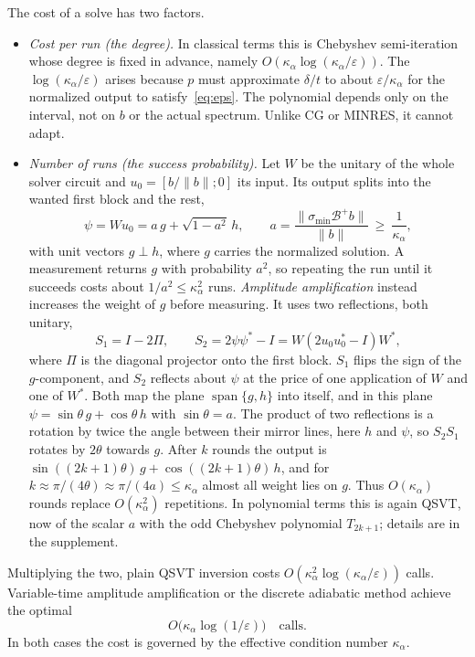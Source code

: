 \documentclass[11pt,a4paper]{article}
\newcommand{\B}{\mathcal{B}}
\theoremstyle{remark}
\begin{document}
The cost of a solve has two factors.
\begin{itemize}
\item \emph{Cost per run (the degree).} In classical terms this is Chebyshev semi-iteration whose degree is
  fixed in advance, namely $O(\kappa_\alpha\log(\kappa_\alpha/\varepsilon))$. The $\log(\kappa_\alpha/\varepsilon)$
  arises because $p$ must approximate $\delta/t$ to about $\varepsilon/\kappa_\alpha$ for the
  normalized output to satisfy~\eqref{eq:eps}. The polynomial
  depends only on the interval, not on $b$ or the actual spectrum. Unlike CG
  or MINRES, it cannot adapt.
\item \emph{Number of runs (the success probability).} Let $W$ be the unitary
  of the whole solver circuit and $u_0=[b/\|b\|;0]$ its input. Its output splits into
  the wanted first block and the rest,
  \[
  \psi=Wu_0=a\,g+\sqrt{1-a^2}\,h,\qquad
  a=\frac{\|\sigma_{\min}\B^+b\|}{\|b\|}\ \ge\ \frac1{\kappa_\alpha},
  \]
  with unit vectors $g\perp h$, where $g$ carries the normalized solution. A
  measurement returns $g$ with probability $a^2$, so repeating the run until it
  succeeds costs about $1/a^2\le\kappa_\alpha^2$ runs. \emph{Amplitude amplification}
  \cite{BHMT02} instead increases the weight of $g$ before measuring. It uses
  two reflections, both unitary,
  \[
  S_1=I-2\Pi,\qquad S_2=2\psi\psi^*-I=W(2u_0u_0^*-I)W^*,
  \]
  where $\Pi$ is the diagonal projector onto the first block. $S_1$ flips the
  sign of the $g$-component, and $S_2$ reflects about $\psi$ at the price of one
  application of $W$ and one of $W^*$. Both map the plane $\operatorname{span}\{g,h\}$
  into itself, and in this plane $\psi=\sin\theta\,g+\cos\theta\,h$ with $\sin\theta=a$.
  The product of two reflections is a rotation by twice the angle between
  their mirror lines, here $h$ and $\psi$, so $S_2S_1$ rotates by $2\theta$
  towards $g$. After $k$ rounds the output is
  $\sin((2k+1)\theta)\,g+\cos((2k+1)\theta)\,h$, and for $k\approx\pi/(4\theta)\approx\pi/(4a)\le\kappa_\alpha$
  almost all weight lies on $g$. Thus $O(\kappa_\alpha)$ rounds replace $O(\kappa_\alpha^2)$
  repetitions. In polynomial terms this is again QSVT, now of the scalar $a$
  with the odd Chebyshev polynomial $T_{2k+1}$; details are in the supplement.
\end{itemize}
Multiplying the two, plain QSVT inversion costs $O(\kappa_\alpha^2\log(\kappa_\alpha/\varepsilon))$ calls.
Variable-time amplitude amplification \cite{CKS17} or the discrete adiabatic
method \cite{Costa22} achieve the optimal
\begin{equation}\label{eq:cost}
O\big(\kappa_\alpha\log(1/\varepsilon)\big)\quad\text{calls}.
\end{equation}
In both cases the cost is governed by the effective condition number
$\kappa_\alpha$.
\end{document}
